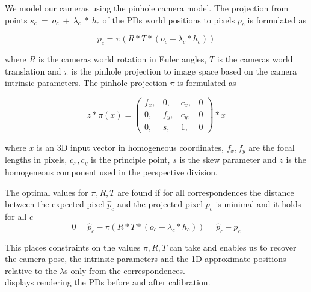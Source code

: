 We model our cameras using the pinhole camera model. 
The projection from points $s_c~=~o_c~+~\lambda_c~*~h_c$ of the PDs world positions to pixels $p_c$ is formulated as

\begin{equation}
  \label{eq:static_calibration_reprojection}
  p_c = \pi \left( R * T * (o_c + \lambda_c * h_c) \right)
\end{equation}

where $R$ is the cameras world rotation in Euler angles, $T$ is the cameras world translation and $\pi$ is the pinhole projection to image space based on the camera intrinsic parameters.
The pinhole projection $\pi$ is formulated as

\begin{equation}
  \label{eq:static_calibration_intrinsic_parameters}
  z * \pi(x) =   
  \begin{pmatrix}
    f_x,& 0,& c_x,& 0\\
    0,& f_y,& c_y,& 0\\
    0,& s,& 1 ,& 0
  \end{pmatrix} * x 
\end{equation}

where $x$ is an 3D input vector in homogeneous coordinates, $f_x, f_y$ are the focal lengths in pixels, $c_x, c_y$ is the principle point, $s$ is the skew parameter and $z$ is the homogeneous component used in the perspective division. 

The optimal values for $\pi,R,T$ are found if for all correspondences the distance between the expected pixel $\hat{p}_c$ and the projected pixel $p_c$ is minimal and it holds for all $c$
\begin{equation}
  0 = \hat{p}_c - \pi \left( R * T * (o_c + \lambda_c * h_c)\right) = \hat{p}_c - p_c
\end{equation}

This places constraints on the values $\pi,R,T$ can take and enables us to recover the camera pose, the intrinsic parameters and the 1D approximate positions relative to the $\lambda$s only from the correspondences.\\
 displays rendering the PDs before and after calibration.


